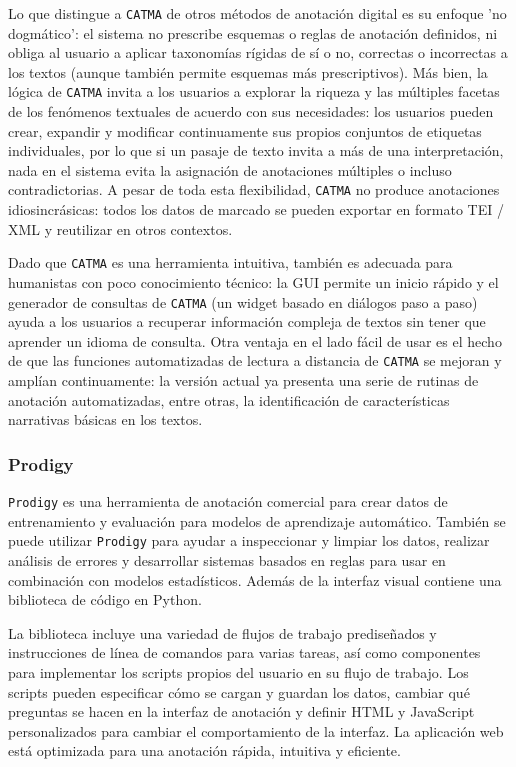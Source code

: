 Lo que distingue a \texttt{CATMA} de otros métodos de anotación digital es su enfoque 'no dogmático': el sistema no prescribe esquemas o reglas de anotación definidos, ni obliga al usuario a aplicar taxonomías rígidas de sí o no, correctas o incorrectas a los textos (aunque también permite esquemas más prescriptivos).
Más bien, la lógica de \texttt{CATMA} invita a los usuarios a explorar la riqueza y las múltiples facetas de los fenómenos textuales de acuerdo con sus necesidades: los usuarios pueden crear, expandir y modificar continuamente sus propios conjuntos de etiquetas individuales, por lo que si un pasaje de texto invita a más de una interpretación, nada en el sistema evita la asignación de anotaciones múltiples o incluso contradictorias.
A pesar de toda esta flexibilidad, \texttt{CATMA} no produce anotaciones idiosincrásicas: todos los datos de marcado se pueden exportar en formato TEI / XML y reutilizar en otros contextos.

Dado que \texttt{CATMA} es una herramienta intuitiva, también es adecuada para humanistas con poco conocimiento técnico: la GUI permite un inicio rápido y el generador de consultas de \texttt{CATMA} (un widget basado en diálogos paso a paso) ayuda a los usuarios a recuperar información compleja de textos sin tener que aprender un idioma de consulta.
Otra ventaja en el lado fácil de usar es el hecho de que las funciones automatizadas de lectura a distancia de \texttt{CATMA} se mejoran y amplían continuamente: la versión actual ya presenta una serie de rutinas de anotación automatizadas, entre otras, la identificación de características narrativas básicas en los textos.

\subsubsection*{Prodigy}

\texttt{Prodigy} es una herramienta de anotación comercial para crear datos de entrenamiento y evaluación para modelos de aprendizaje automático.
También se puede utilizar \texttt{Prodigy} para ayudar a inspeccionar y limpiar los datos, realizar análisis de errores y desarrollar sistemas basados en reglas para usar en combinación con modelos estadísticos.
Además de la interfaz visual contiene una biblioteca de código en Python.

La biblioteca incluye una variedad de flujos de trabajo prediseñados y instrucciones de línea de comandos para varias tareas, así como componentes para implementar los scripts propios del usuario en su flujo de trabajo.
Los scripts pueden especificar cómo se cargan y guardan los datos, cambiar qué preguntas se hacen en la interfaz de anotación y definir HTML y JavaScript personalizados para cambiar el comportamiento de la interfaz.
La aplicación web está optimizada para una anotación rápida, intuitiva y eficiente.

